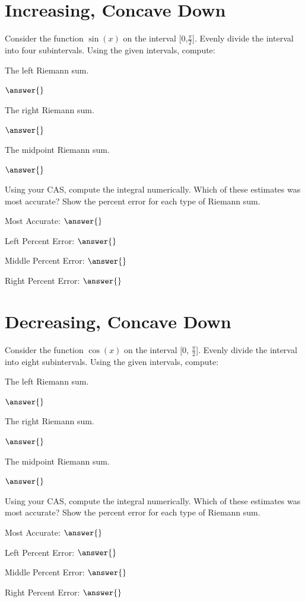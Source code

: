 \documentclass{ximera}
\begin{document}
\section{Increasing, Concave Down}
\begin{question}
Consider the function $\sin(x)$ on the interval [0,$\frac{\pi}{2}$]. Evenly divide the interval into four subintervals.
Using the given intervals, compute:

The left Riemann sum.

$\answer{}$

The right Riemann sum.

$\answer{}$

The midpoint Riemann sum.

$\answer{}$

Using your CAS, compute the integral numerically. Which of these estimates was most accurate? Show the percent error for each type of Riemann sum.

Most Accurate: $\answer{}$

Left Percent Error: $\answer{}$

Middle Percent Error: $\answer{}$

Right Percent Error: $\answer{}$
\end{question}


\section{Decreasing, Concave Down}
\begin{question}
Consider the function $\cos(x)$ on the interval [0, $\frac{\pi}{2}$]. Evenly divide the interval into eight subintervals.
Using the given intervals, compute:

The left Riemann sum.

$\answer{}$

The right Riemann sum.

$\answer{}$

The midpoint Riemann sum.

$\answer{}$

Using your CAS, compute the integral numerically. Which of these estimates was most accurate? Show the percent error for each type of Riemann sum.

Most Accurate: $\answer{}$

Left Percent Error: $\answer{}$

Middle Percent Error: $\answer{}$

Right Percent Error: $\answer{}$
\end{question}
\end{document}
